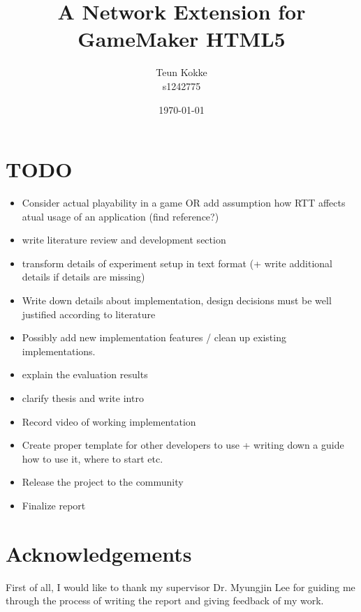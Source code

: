 \documentclass[bsc,frontabs,twoside,singlespacing,parskip,deptreport]{infthesis}     %
\begin{document}
\title{A Network Extension for GameMaker HTML5}

\author{Teun Kokke\\s1242775}

\date{\today}


\maketitle

\section*{TODO}
\begin{itemize}
\item Consider actual playability in a game OR add assumption how RTT affects atual usage of an application (find reference?)
\item write literature review and development section
\item transform details of experiment setup in text format (+ write additional details if details are missing)
\item Write down details about implementation, design decisions must be well justified according to literature
\item Possibly add new implementation features / clean up existing implementations.
\item explain the evaluation results
\item clarify thesis and write intro
\item Record video of working implementation
\item Create proper template for other developers to use + writing down a guide how to use it, where to start etc.
\item Release the project to the community
\item Finalize report
\end{itemize}

\pagebreak

\section*{Acknowledgements}
First of all, I would like to thank my supervisor Dr. Myungjin Lee for guiding me through the process of writing the report and giving feedback of my work.
\end{document}
